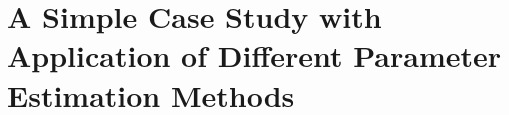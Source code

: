 \documentclass[../main.tex]{subfiles}
\begin{document}
\chapter{A Simple Case Study with Application of Different Parameter Estimation Methods}
\end{document}
